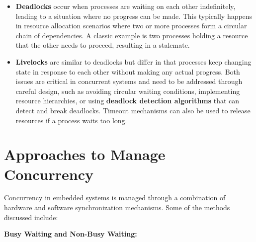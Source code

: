 \documentclass[
  14pt,
  a4paper,
  numbers=noendperiod,
  headinclude=true,
  footinclude=true,
  DIV=calc]{scrreprt}
\begin{document}
\begin{itemize}
\item
  \textbf{Deadlocks} occur when processes are waiting on each other
  indefinitely, leading to a situation where no progress can be made.
  This typically happens in resource allocation scenarios where two or
  more processes form a circular chain of dependencies. A classic
  example is two processes holding a resource that the other needs to
  proceed, resulting in a stalemate.
\item
  \textbf{Livelocks} are similar to deadlocks but differ in that
  processes keep changing state in response to each other without making
  any actual progress. Both issues are critical in concurrent systems
  and need to be addressed through careful design, such as avoiding
  circular waiting conditions, implementing resource hierarchies, or
  using \textbf{deadlock detection algorithms} that can detect and break
  deadlocks. Timeout mechanisms can also be used to release resources if
  a process waits too long.
\end{itemize}

\section{Approaches to Manage
Concurrency}\label{approaches-to-manage-concurrency}

Concurrency in embedded systems is managed through a combination of
hardware and software synchronization mechanisms. Some of the methods
discussed include:

\textbf{Busy Waiting and Non-Busy Waiting:}
\end{document}
